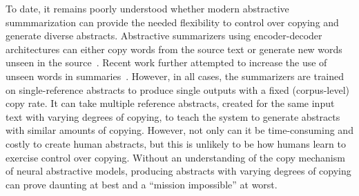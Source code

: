 \documentclass[letterpaper]{article} %
\begin{document}
To date, it remains poorly understood whether modern abstractive summmarization can provide the needed flexibility to control over copying and generate diverse abstracts.
Abstractive summarizers using encoder-decoder architectures can either copy words from the source text or generate new words unseen in the source~\cite{See:2017,Chen:2018:ACL,Gehrmann:2018}.
Recent work further attempted to increase the use of unseen words in summaries~\cite{Weber:2018,Kryscinski:2018}.
However, in all cases, the summarizers are trained on single-reference abstracts to produce single outputs with a fixed (corpus-level) copy rate. 
It can take multiple reference abstracts, created for the same input text with varying degrees of copying, to teach the system to generate abstracts with similar amounts of copying.
However, not only can it be time-consuming and costly to create human abstracts, but this is unlikely to be how humans learn to exercise control over copying.
Without an understanding of the copy mechanism of neural abstractive models, producing abstracts with varying degrees of copying can prove daunting at best and a ``mission impossible'' at worst.
\end{document}
